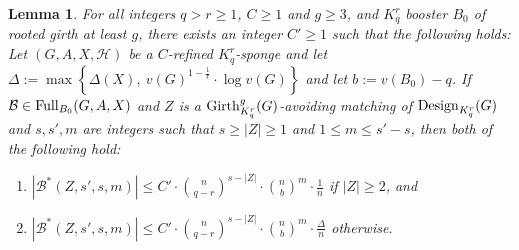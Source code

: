 \documentclass[11pt]{article}
\newcommand{\mc}[1]{\mathcal{#1}}
\newcounter{i}
\theoremstyle{plain}
\newtheorem{lem}[thm]{Lemma}
\theoremstyle{plain} %
\theoremstyle{definition}
\begin{document}
\begin{lem}\label{lem:GirthConfigPrelim}
For all integers $q>r\ge 1$, $C\ge 1$ and $g\ge 3$, and $K_q^r$ booster $B_0$ of rooted girth at least $g$, there exists an integer $C'\ge 1$ such that the following holds: Let $(G,A,X,\mc{H})$ be a $C$-refined $K_q^r$-sponge and let $\Delta := \max\left\{ \Delta(X),~v(G)^{1-\frac{1}{r}}\cdot \log v(G)\right\}$ and let $b:=v(B_0)-q$. If $\mc{B} \in {\rm Full}_{B_0}(G,A,X)$ and $Z$ is a ${\rm Girth}_{K_q^r}^g(G)$-avoiding matching of ${\rm Design}_{K_q^r}(G)$ and $s, s', m$ are integers such that $s \ge |Z|\ge 1$ and $1\le m\le s'-s$, then
both of the following hold:
\begin{enumerate}
    \item[(1)] $|\mc{B}^{*}(Z,s',s,m)|\le C'\cdot \binom{n}{q-r}^{s-|Z|}\cdot \binom{n}{b}^{m}\cdot \frac{1}{n}$ if $|Z|\ge 2$, and 
    \item[(2)] $|\mc{B}^{*}(Z,s',s,m)|\le C'\cdot \binom{n}{q-r}^{s-|Z|}\cdot \binom{n}{b}^{m}\cdot \frac{\Delta}{n}$ otherwise. 
\end{enumerate}    
\end{lem}
\end{document}
